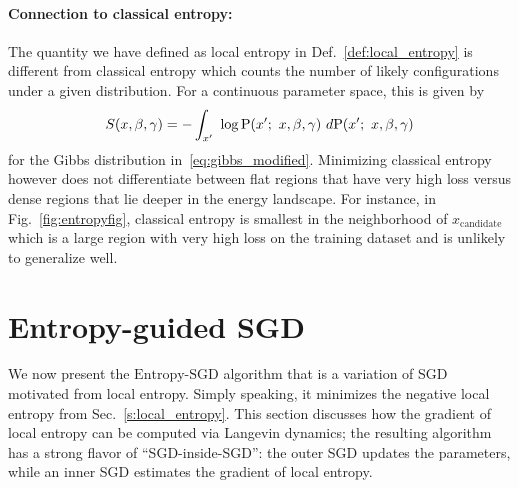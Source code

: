 \documentclass[10pt]{article}
\newcommand{\entropysgd}{\mathrm{Entropy}\textrm{-}\mathrm{SGD}}
\newcommand{\ignore}[1]{}
\begin{document}
\paragraph{Connection to classical entropy:}
The quantity we have defined as local entropy in Def.~\ref{def:local_entropy} is different from classical entropy which counts the number of likely configurations under a given distribution. For a continuous parameter space, this is given by
$$
    S(x, \beta, \gamma) = - \int_{x'}\ \log \mathrm{P}(x';\ x, \beta, \gamma)\ d \mathrm{P}(x';\ x, \beta, \gamma)
$$
for the Gibbs distribution in~\eqref{eq:gibbs_modified}. Minimizing classical entropy however does not differentiate between flat regions that have very high loss versus dense regions that lie deeper in the energy landscape. For instance, in Fig.~\ref{fig:entropyfig}, classical entropy is smallest in the neighborhood of $x_{\textrm{candidate}}$ which is a large region with very high loss on the training dataset and is unlikely to generalize well.
\ignore{We could minimize a modified loss function of the form $f(x) + \lambda S(x, \g)$ whose gradient can be computed to be
$$
    \nabla \Big(f(x) + \lambda S(x, \g)\Big) = \nabla f(x) - \lambda \g\ \corr (g(x'),\ x-x');
$$
where we have defined the cross-correlation as
$$
    \corr (g(x'),\ x-x') := \ag{g(x')\ (x-x')} - \ag{g(x')}\ \ag{x-x'};
$$
with $g(x') = f(x') + \f{\g}{2}\ \norm{x-x'}^2_2$. The gradient of the entropy can again be estimated using Langevin dynamics. Practically, one then has to modulate the hyper-parameter $\lambda$ during the course of the training to first use the gradient $\nabla f(x)$ to make progress and then turn on the entropy term to scope dense clusters.}

\section{Entropy-guided SGD}
\label{s:entropysgd}

We now present the $\entropysgd$ algorithm that is a variation of SGD motivated from local entropy. Simply speaking, it minimizes the negative local entropy from Sec.~\ref{s:local_entropy}. This section discusses how the gradient of local entropy can be computed via Langevin dynamics; the resulting algorithm has a strong flavor of ``SGD-inside-SGD'': the outer SGD updates the parameters, while an inner SGD estimates the gradient of local entropy.
\end{document}
